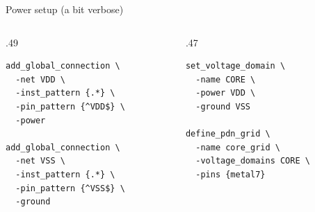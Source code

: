 \begin{frame}[fragile]{Power setup (a bit verbose)}
\begin{columns}[T,onlytextwidth]
\begin{column}{.49\textwidth}
\begin{lstlisting}[basicstyle=\ttfamily\fontsize{8}{11}\selectfont]
add_global_connection \
  -net VDD \
  -inst_pattern {.*} \
  -pin_pattern {^VDD$} \
  -power

add_global_connection \
  -net VSS \
  -inst_pattern {.*} \
  -pin_pattern {^VSS$} \
  -ground
\end{lstlisting}
\end{column}
\begin{column}{.47\textwidth}
\begin{lstlisting}[basicstyle=\ttfamily\fontsize{8}{11}\selectfont]
set_voltage_domain \
  -name CORE \
  -power VDD \
  -ground VSS

define_pdn_grid \
  -name core_grid \
  -voltage_domains CORE \
  -pins {metal7}
\end{lstlisting}
\end{column}
\end{columns}
\end{frame}

